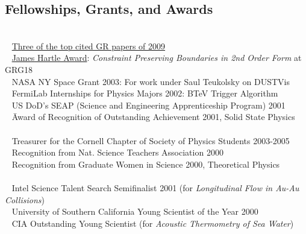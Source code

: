\documentclass[11pt]{seilercv}
\begin{document}
\begin{textblock}{9.6}
\vspace{-0.3cm}\section{Fellowships, Grants, and Awards}
\begin{tabbing}
\vspace{-0.3em}{\textbullet~  Visiting Scientist Grant from Universitat de les Illes Balears for October 2010}
\\{\textbullet~ \href{http://www.slac.stanford.edu/spires/topcites/2009/eprints/to_gr-qc_annual.shtml}{Three of the top cited GR papers of 2009}}
\\{\textbullet~ \href{http://arxiv.org/pdf/0709.0942}{James Hartle Award}:} \textit{Constraint Preserving Boundaries in 2nd Order Form} at GRG18
\\{\textbullet~ NASA NY Space Grant 2003:} For work under Saul Teukolsky on DUSTVis
\\{\textbullet~ FermiLab Internships for Physics Majors 2002:} BTeV Trigger Algorithm
\\{\textbullet~ US DoD's SEAP (Science and Engineering Apprenticeship Program) 2001}
\\{\textbullet~} \={Award of Recognition of Outstanding Achievement 2001, Solid State Physics}
\\ 
\\{\textbullet~ Treasurer for the Cornell Chapter of Society of Physics Students 2003-2005}
\\{\textbullet~ Recognition from Nat. Science Teachers Association 2000}
\\{\textbullet~ Recognition from Graduate Women in Science 2000, Theoretical Physics }
\\ 
\\{\textbullet~ Intel Science Talent Search Semifinalist 2001 (for \textit{Longitudinal Flow in Au-Au Collisions})} 
\\{\textbullet~ University of Southern California Young Scientist of the Year 2000 }
\\{\textbullet~ CIA Outstanding Young Scientist (for \textit{Acoustic Thermometry of Sea Water}) }

\end{tabbing}
\end{textblock}
\end{document}

